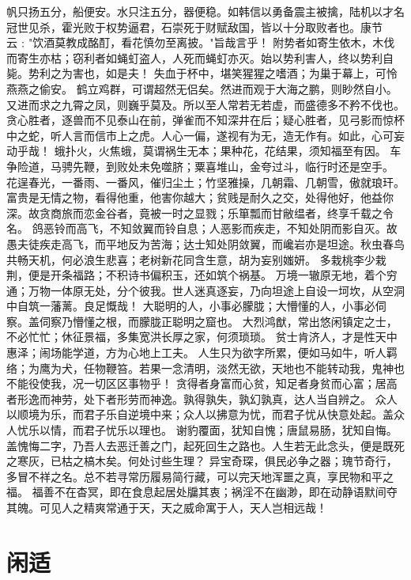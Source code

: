 \documentclass[12pt,UTF8]{ctexbook}
\begin{document}
帆只扬五分，船便安。水只注五分，器便稳。如韩信以勇备震主被擒，陆机以才名冠世见杀，霍光败于权势逼君，石崇死于财赋敌国，皆以十分取败者也。康节云﹕"饮酒莫教成酩酊，看花慎勿至离披。"旨哉言乎！
附势者如寄生依木，木伐而寄生亦枯；窃利者如蝇虰盗人，人死而蝇虰亦灭。始以势利害人，终以势利自毙。势利之为害也，如是夫！
失血于杯中，堪笑猩猩之嗜酒；为巢于幕上，可怜燕燕之偷安。
鹤立鸡群，可谓超然无侣矣。然进而观于大海之鹏，则眇然自小。又进而求之九霄之凤，则巍乎莫及。所以至人常若无若虚，而盛德多不矜不伐也。贪心胜者，逐兽而不见泰山在前，弹雀而不知深井在后；疑心胜者，见弓影而惊杯中之蛇，听人言而信市上之虎。人心一偏，遂视有为无，造无作有。如此，心可妄动乎哉！
蛾扑火，火焦蛾，莫谓祸生无本；果种花，花结果，须知福至有因。
车争险道，马骋先鞭，到败处未免噬脐；粟喜堆山，金夸过斗，临行时还是空手。
花逞春光，一番雨、一番风，催归尘土；竹坚雅操，几朝霜、几朝雪，傲就琅玕。
富贵是无情之物，看得他重，他害你越大；贫贱是耐久之交，处得他好，他益你深。故贪商旅而恋金谷者，竟被一时之显戮；乐箪瓢而甘敝缊者，终享千载之令名。
鸽恶铃而高飞，不知敛翼而铃自息；人恶影而疾走，不知处阴而影自灭。故愚夫徒疾走高飞，而平地反为苦海；达士知处阴敛翼，而巉岩亦是坦途。秋虫春鸟共畅天机，何必浪生悲喜；老树新花同含生意，胡为妄别媸妍。
多栽桃李少栽荆，便是开条福路；不积诗书偏积玉，还如筑个祸基。
万境一辙原无地，着个穷通；万物一体原无处，分个彼我。世人迷真逐妄，乃向坦途上自设一坷坎，从空洞中自筑一藩蓠。良足慨哉！
大聪明的人，小事必朦胧；大懵懂的人，小事必伺察。盖伺察乃懵懂之根，而朦胧正聪明之窟也。
大烈鸿猷，常出悠闲镇定之士，不必忙忙；休征景福，多集宽洪长厚之家，何须琐琐。
贫士肯济人，才是性天中惠泽；闹场能学道，方为心地上工夫。
人生只为欲字所累，便如马如牛，听人羁络；为鹰为犬，任物鞭笞。若果一念清明，淡然无欲，天地也不能转动我，鬼神也不能役使我，况一切区区事物乎！
贪得者身富而心贫，知足者身贫而心富；居高者形逸而神劳，处下者形劳而神逸。孰得孰失，孰幻孰真，达人当自辨之。
众人以顺境为乐，而君子乐自逆境中来；众人以拂意为忧，而君子忧从快意处起。盖众人忧乐以情，而君子忧乐以理也。
谢豹覆面，犹知自愧；唐鼠易肠，犹知自悔。盖愧悔二字，乃吾人去恶迁善之门，起死回生之路也。人生若无此念头，便是既死之寒灰，已枯之槁木矣。何处讨些生理？
异宝奇琛，俱民必争之器；瑰节奇行，多冒不祥之名。总不若寻常历履易简行藏，可以完天地浑噩之真，享民物和平之福。
福善不在杳冥，即在食息起居处牖其衷；祸淫不在幽渺，即在动静语默间夺其魄。可见人之精爽常通于天，天之威命寓于人，天人岂相远哉！

\chapter{闲适}
\end{document}
